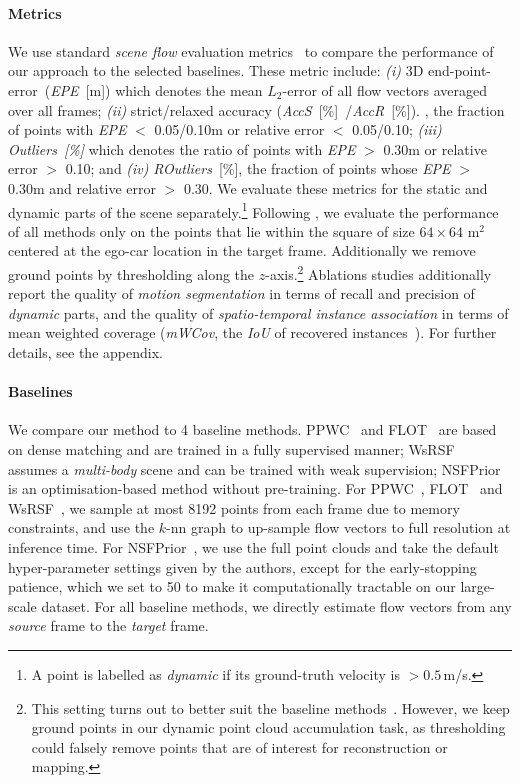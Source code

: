 
\paragraph{Metrics}
We use standard \emph{scene flow} evaluation metrics~\cite{liu2019flownet3d,baur2021slim} to compare the performance of our approach to the selected baselines. These metric include:
\textit{(i)} 3D end-point-error~(\textit{EPE}~[m]) which denotes the mean $L_2$-error of all flow vectors averaged over all frames; 
\textit{(ii)} strict/relaxed accuracy (\textit{AccS}~[\%]~/\textit{AccR}~[\%]). \ie, the fraction of points with \textit{EPE} $<$ 0.05/0.10m or relative error $<$ 0.05/0.10; \textit{(iii)} \textit{Outliers~[\%]} which denotes the ratio of points with \textit{EPE} $>$ 0.30m or relative error $>$ 0.10; and \textit{(iv)} \textit{ROutliers}~[\%], the fraction of points whose \textit{EPE} $>$ 0.30m and relative error $>$ 0.30. We evaluate these metrics for the static and dynamic parts of the scene separately.\footnote{A point is labelled as \textit{dynamic} if its ground-truth velocity is $>0.5\,$m/s.} %
Following \cite{wu2020motionnet,luo2021self}, we evaluate the performance of all methods only on the points that lie within the square of size $64\times 64$ m$^2$ centered at the ego-car location in the target frame. Additionally we remove ground points by thresholding along the $z$-axis.\footnote{This setting turns out to better suit the baseline methods~\cite{puy2020flot,wu2019pointpwc,li2021neural}. However, we keep ground points in our dynamic point cloud accumulation task, as thresholding could falsely remove points that are of interest for reconstruction or mapping.} Ablations studies additionally report the quality of \textit{motion segmentation} in terms of recall and precision of \textit{dynamic} parts, and the quality of \textit{spatio-temporal instance association} in terms of mean weighted coverage (\textit{mWCov}, the \textit{IoU} of recovered instances~\cite{wang2019associatively}). For further details, see the appendix.

\paragraph{Baselines}
We compare our method to 4 baseline methods. PPWC~\cite{wu2019pointpwc} and FLOT~\cite{puy2020flot} are based on dense matching and are trained in a fully supervised manner; WsRSF~\cite{gojcic2021weakly} assumes a \textit{multi-body} scene and can be trained with weak supervision; NSFPrior~\cite{li2021neural} is an optimisation-based method without pre-training. For PPWC~\cite{wu2019pointpwc}, FLOT~\cite{puy2020flot} and WsRSF~\cite{gojcic2021weakly}, we sample at most 8192 points from each frame due to memory constraints, and use the $k$-nn graph to up-sample flow vectors to full resolution at inference time. For NSFPrior~\cite{li2021neural}, we use the full point clouds and take the default hyper-parameter settings given by the authors, except for the early-stopping patience, which we set to 50 to make it computationally tractable on our large-scale dataset. For all baseline methods, we directly estimate flow vectors from any \textit{source} frame to the \textit{target} frame. 

